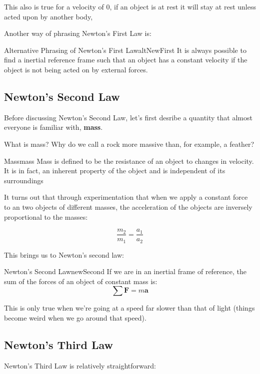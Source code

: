 \documentclass{report}
\begin{document}
This also is true for a velocity of 0, if an object is at rest it will stay at rest unless acted upon by another body,

Another way of phrasing Newton's First Law is:

\begin{mytheo}{Alternative Phrasing of Newton's First Law}{altNewFirst}
    It is always possible to find a inertial reference frame such that an object has a constant velocity if the object is not being acted on by external forces.
\end{mytheo}

\subsection{Newton's Second Law}
Before discussing Newton's Second Law, let's first desribe a quantity that almost everyone is familiar with, \textbf{mass}.

What is mass? Why do we call a rock more massive than, for example, a feather?

\begin{mytheo}{Mass}{mass}
    Mass is defined to be the resistance of an object to changes in velocity. It is in fact, an inherent property of the object and is independent of its surroundings
\end{mytheo}

It turns out that through experimentation that when we apply a constant force to an two objects of different masses, the acceleration of the objects are inversely proportional to the masses:

$$\frac{m_2}{m_1} = \frac{a_1}{a_2}$$

This brings us to Newton's second law:

\begin{mytheo}{Newton's Second Law}{newSecond}
    If we are in an inertial frame of reference, the sum of the forces of an object of constant mass is:
    $$\sum \mathbf{F} = m\mathbf{a}$$
\end{mytheo}

This is only true when we're going at a speed far slower than that of light (things become weird when we go around that speed).

\subsection{Newton's Third Law}

Newton's Third Law is relatively straightforward:
\end{document}
